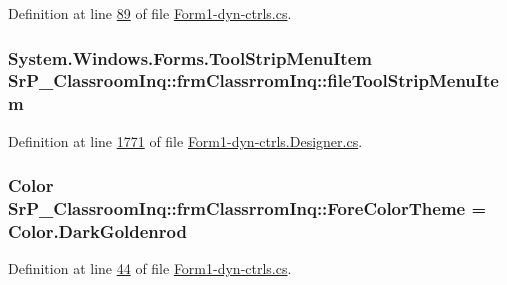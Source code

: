 \-Definition at line \hyperlink{_form1-dyn-ctrls_8cs_source_l00089}{89} of file \hyperlink{_form1-dyn-ctrls_8cs_source}{\-Form1-\/dyn-\/ctrls.\-cs}.

\hypertarget{class_sr_p___classroom_inq_1_1frm_classrrom_inq_a4aac2987ba1f61ee4bde4d91cdf35476}{
\subsubsection[{file\-Tool\-Strip\-Menu\-Item}]{\setlength{\rightskip}{0pt plus 5cm}\-System.\-Windows.\-Forms.\-Tool\-Strip\-Menu\-Item {\bf \-Sr\-P\-\_\-\-Classroom\-Inq\-::frm\-Classrrom\-Inq\-::file\-Tool\-Strip\-Menu\-Item}}}
\label{class_sr_p___classroom_inq_1_1frm_classrrom_inq_a4aac2987ba1f61ee4bde4d91cdf35476}


\-Definition at line \hyperlink{_form1-dyn-ctrls_8_designer_8cs_source_l01771}{1771} of file \hyperlink{_form1-dyn-ctrls_8_designer_8cs_source}{\-Form1-\/dyn-\/ctrls.\-Designer.\-cs}.

\hypertarget{class_sr_p___classroom_inq_1_1frm_classrrom_inq_ac239384db4489bc4b8b2a4cee9280849}{
\subsubsection[{\-Fore\-Color\-Theme}]{\setlength{\rightskip}{0pt plus 5cm}\-Color {\bf \-Sr\-P\-\_\-\-Classroom\-Inq\-::frm\-Classrrom\-Inq\-::\-Fore\-Color\-Theme} = \-Color.\-Dark\-Goldenrod}}
\label{class_sr_p___classroom_inq_1_1frm_classrrom_inq_ac239384db4489bc4b8b2a4cee9280849}


\-Definition at line \hyperlink{_form1-dyn-ctrls_8cs_source_l00044}{44} of file \hyperlink{_form1-dyn-ctrls_8cs_source}{\-Form1-\/dyn-\/ctrls.\-cs}.

